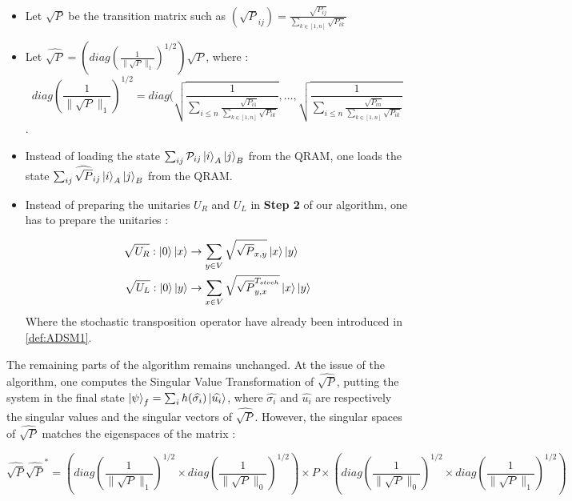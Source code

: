 \documentclass{article}
\begin{document}
\begin{itemize}
    \item Let $\sqrt{P}$ be the transition matrix such as $(\sqrt{P}_{ij}) = \frac{\sqrt{P_{ij}}}{\sum_{k \in [1,n]} \sqrt{P_{ik}}}$
    
    \item Let $\widehat{\sqrt{P}} = (diag(\frac{1}{\|\sqrt{P}\|_1})^{1/2}) \sqrt{P}$, where :
    \begin{equation}
        diag(\frac{1}{\|\sqrt{P}\|_1})^{1/2} = diag(\sqrt{\frac{1}{\sum_{i\leq n}\frac{\sqrt{P_{i1}}}{\sum_{k \in [1,n]} \sqrt{P_{ik}}}}}, \hdots, \sqrt{\frac{1}{\sum_{i\leq n}\frac{\sqrt{P_{in}}}{\sum_{k \in [1,n]} \sqrt{P_{ik}}}}}
    \end{equation}.
    
    \item Instead of loading the state $\sum_{ij} \mathcal{P}_{ij} \ket{i}_A \ket{j}_B$ from the QRAM, one loads the state $\sum_{ij} \widehat{\sqrt{P}}_{ij} \ket{i}_A \ket{j}_B$ from the QRAM.
    
    \item Instead of preparing the unitaries $U_R$ and $U_L$ in \textbf{Step 2} of our algorithm, one has to prepare the unitaries :
    
    \begin{align}
        \sqrt{U_R} : \ket{0}\ket{x} &\rightarrow \sum_{y\in V} \sqrt{\sqrt{P}_{x,y}} \ket{x} \ket{y} \\
        \sqrt{U_L} : \ket{0}\ket{y} &\rightarrow \sum_{x\in V} \sqrt{\sqrt{P}^{T_{stoch}}_{y,x}} \ket{x} \ket{y}
    \end{align}
    Where the stochastic transposition operator have already been introduced in \ref{def:ADSM1}.
\end{itemize}

The remaining parts of the algorithm remains unchanged. At the issue of the algorithm, one computes the Singular Value Transformation of $\widehat{\sqrt{P}}$, putting the system in the final state $\ket{\psi}_f = \sum_i h(\widehat{\sigma_i}) \ket{\widehat{u_i}}$, where $\widehat{\sigma_i}$ and $\widehat{u_i}$ are respectively the singular values and the singular vectors of $\widehat{\sqrt{P}}$. However, the singular spaces of $\widehat{\sqrt{P}}$ matches the eigenspaces of the matrix :

\begin{equation}
    \widehat{\sqrt{P}}\widehat{\sqrt{P}}^* = (diag(\frac{1}{\|\sqrt{P}\|_1})^{1/2} \times diag(\frac{1}{\|\sqrt{P}\|_0})^{1/2}) \times P \times (diag(\frac{1}{\|\sqrt{P}\|_0})^{1/2} \times diag(\frac{1}{\|\sqrt{P}\|_1})^{1/2})
\end{equation}
\end{document}
